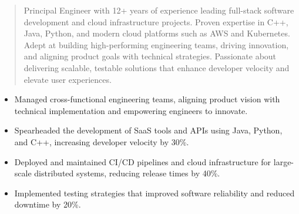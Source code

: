 



\makecvheader

\begin{quote}
  \noindent
  Principal Engineer with 12+ years of experience leading full-stack software development and cloud infrastructure projects. Proven expertise in C++, Java, Python, and modern cloud platforms such as AWS and Kubernetes. Adept at building high-performing engineering teams, driving innovation, and aligning product goals with technical strategies. Passionate about delivering scalable, testable solutions that enhance developer velocity and elevate user experiences.
\end{quote}

\par\smallskip
\noindent
\begin{minipage}{20cm}
  \begin{minipage}{9.75cm}
    \begin{itemize}
      \item Managed cross-functional engineering teams, aligning product vision with technical implementation and empowering engineers to innovate.
      \item Spearheaded the development of SaaS tools and APIs using Java, Python, and C++, increasing developer velocity by 30\%.
    \end{itemize}
  \end{minipage}
  \hfill
  \begin{minipage}{9.75cm}
    \begin{itemize}
      \item Deployed and maintained CI/CD pipelines and cloud infrastructure for large-scale distributed systems, reducing release times by 40\%.
      \item Implemented testing strategies that improved software reliability and reduced downtime by 20\%.
    \end{itemize}
  \end{minipage}
\end{minipage}
\par\smallskip
\divider


